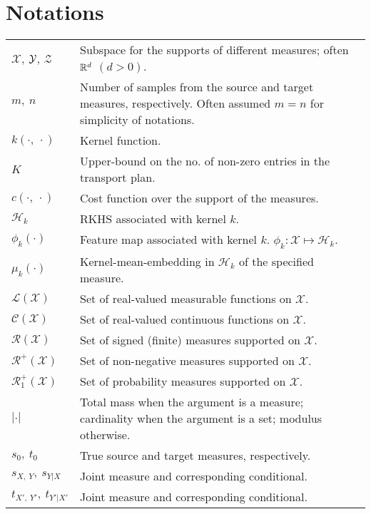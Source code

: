 \section*{Notations}
\vspace{0.25in}
\setlength{\tabcolsep}{2pt}
\begin{tabular}{@{}l  p{125mm}@{}}
$\mathcal{X}$, $\mathcal{Y}$, $\mathcal{Z}$ & Subspace for the supports of different measures; often $\mathbb{R}^d$ $(d>0)$.\\
$m,\ n$ & Number of samples from the source and target measures, respectively. Often assumed $m=n$ for simplicity of notations.\\
$k(\cdot, \ \cdot)$ & Kernel function.\\
$K$ & Upper-bound on the no. of non-zero entries in the transport plan.\\
$c(\cdot, \ \cdot)$ & Cost function over the support of the measures.\\
$\mathcal{H}_k$ & RKHS associated with kernel $k$.\\
$\phi_k(\cdot)$ & Feature map associated with kernel $k$. $\phi_k : \mathcal{X}\mapsto \mathcal{H}_k$.\\
$\mu_k(\cdot)$ & Kernel-mean-embedding in $\mathcal{H}_k$ of the specified measure.\\
$\mathcal{L}(\mathcal{X})$ & Set of real-valued measurable functions on $\mathcal{X}$.\\
$\mathcal{C}(\mathcal{X})$ & Set of real-valued continuous functions on $\mathcal{X}$.\\
$\mathcal{R}(\mathcal{X})$ & Set of signed (finite) measures supported on $\mathcal{X}$.\\
$\mathcal{R}^+(\mathcal{X})$ & Set of non-negative measures supported on $\mathcal{X}$.\\
$\mathcal{R}_1^+(\mathcal{X})$ & Set of probability measures supported on $\mathcal{X}$.\\
$|\cdot|$ & Total mass when the argument is a measure; cardinality when the argument is a set; modulus otherwise.\\
$s_0,\ t_0$ & True source and target measures, respectively.\\
$s_{X,\ Y},\ s_{Y|X}$ & Joint measure and corresponding conditional.\\
$t_{X',\ Y'},\ t_{Y'|X'}$ & Joint measure and corresponding conditional.\\

\end{tabular}
